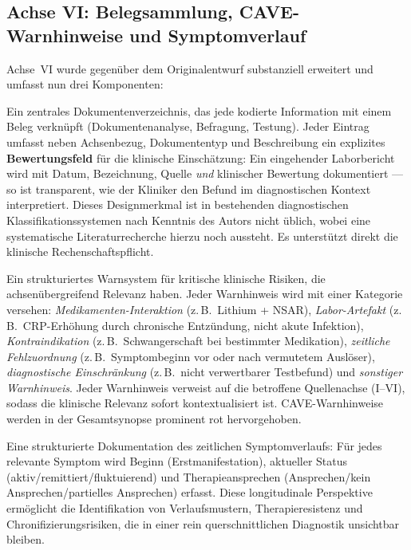 \documentclass[11pt,a4paper]{article}
\begin{document}
\subsection{Achse VI: Belegsammlung, CAVE-Warnhinweise und Symptomverlauf}

Achse~VI wurde gegen\"uber dem Originalentwurf substanziell erweitert und umfasst nun drei Komponenten:

\begin{description}[style=nextline, leftmargin=1.5cm, font=\bfseries]
\item[Evidenz-Matrix] Ein zentrales Dokumentenverzeichnis, das jede kodierte Information mit einem Beleg verkn\"upft (Dokumentenanalyse, Befragung, Testung). Jeder Eintrag umfasst neben Achsenbezug, Dokumententyp und Beschreibung ein explizites \textbf{Bewertungsfeld} f\"ur die klinische Einsch\"atzung: Ein eingehender Laborbericht wird mit Datum, Bezeichnung, Quelle \textit{und} klinischer Bewertung dokumentiert --- so ist transparent, wie der Kliniker den Befund im diagnostischen Kontext interpretiert. Dieses Designmerkmal ist in bestehenden diagnostischen Klassifikationssystemen nach Kenntnis des Autors nicht \"ublich, wobei eine systematische Literaturrecherche hierzu noch aussteht. Es unterst\"utzt direkt die klinische Rechenschaftspflicht.
\item[CAVE-Warnhinweise] Ein strukturiertes Warnsystem f\"ur kritische klinische Risiken, die achsen\"ubergreifend Relevanz haben. Jeder Warnhinweis wird mit einer Kategorie versehen: \textit{Medikamenten-Interaktion} (z.\,B.\ Lithium + NSAR), \textit{Labor-Artefakt} (z.\,B.\ CRP-Erh\"ohung durch chronische Entz\"undung, nicht akute Infektion), \textit{Kontraindikation} (z.\,B.\ Schwangerschaft bei bestimmter Medikation), \textit{zeitliche Fehlzuordnung} (z.\,B.\ Symptombeginn vor oder nach vermutetem Ausl\"oser), \textit{diagnostische Einschr\"ankung} (z.\,B.\ nicht verwertbarer Testbefund) und \textit{sonstiger Warnhinweis}. Jeder Warnhinweis verweist auf die betroffene Quellenachse (I--VI), sodass die klinische Relevanz sofort kontextualisiert ist. CAVE-Warnhinweise werden in der Gesamtsynopse prominent rot hervorgehoben.
\item[Longitudinaler Symptomverlauf] Eine strukturierte Dokumentation des zeitlichen Symptomverlaufs: F\"ur jedes relevante Symptom wird Beginn (Erstmanifestation), aktueller Status (aktiv/remittiert/fluktuierend) und Therapieansprechen (Ansprechen/kein Ansprechen/partielles Ansprechen) erfasst. Diese longitudinale Perspektive erm\"oglicht die Identifikation von Verlaufsmustern, Therapieresistenz und Chronifizierungsrisiken, die in einer rein querschnittlichen Diagnostik unsichtbar bleiben.

\end{description}
\end{document}
